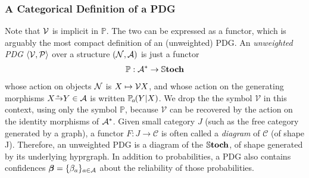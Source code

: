 \subsubsection*{A Categorical Definition of a PDG}
Note that $\mathcal V$ is implicit in $\mathbb P$. 
The two can be expressed as a functor, which is arguably the most
compact definition of an (unweighted) PDG.  
%
    An \emph{unweighted PDG} $\langle\mathcal V, \mathcal P\rangle$ 
    over a structure $(\mathcal N, \mathcal A)$ is just a functor
    \begin{align*}
        {\mathbb P}  : 
            \mathcal A^* \to  \mathbb{S}\mathbf{toch}
    \end{align*} 
    whose action on objects $\mathcal N$ is $X \mapsto \mathcal V X$, and whose action on the generating morphisms $\ed aXY \in \Ar$
    is written
    $\p_a(Y|X)$. 
We drop the the symbol $\mathcal V$ in this context, using only the symbol $\mathbb P$, because $\mathcal V$ can be recovered by the action on the identity morphisms of $\mathcal A^*$. 
% 
Given small category $J$ 
(such as the free category generated by a graph),
a functor $F : J \to \mathcal C$
is often called a \emph{diagram} of $\mathcal C$ (of shape J).
Therefore, an unweighted PDG is a diagram of the $\mathbb{S}\mathbf{toch}$, of shape
generated by its underlying hyprgraph.
In addition to probabilities, a PDG also contains 
confidences $\boldsymbol\beta = \{ \beta_a \}_{a \in \mathcal A}$ about the reliability of those probabilities. 

